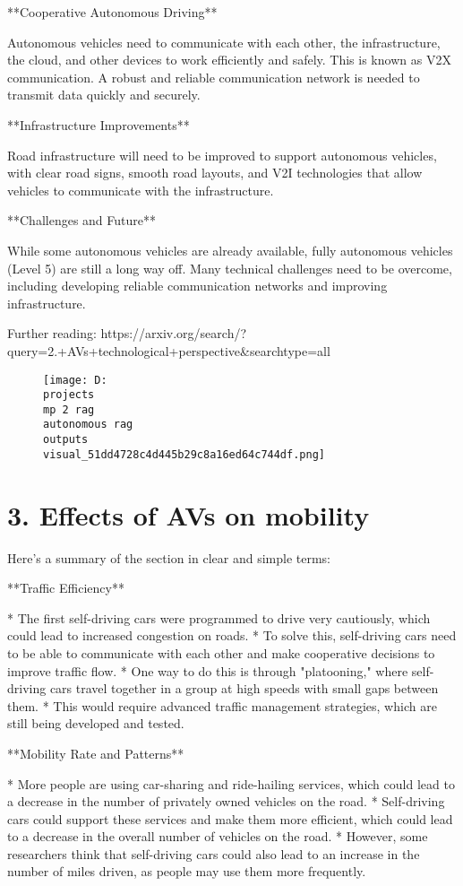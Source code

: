 \documentclass[12pt,a4paper]{article}
\begin{document}
**Cooperative Autonomous Driving**

Autonomous vehicles need to communicate with each other, the infrastructure, the cloud, and other devices to work efficiently and safely. This is known as V2X communication. A robust and reliable communication network is needed to transmit data quickly and securely.

**Infrastructure Improvements**

Road infrastructure will need to be improved to support autonomous vehicles, with clear road signs, smooth road layouts, and V2I technologies that allow vehicles to communicate with the infrastructure.

**Challenges and Future**

While some autonomous vehicles are already available, fully autonomous vehicles (Level 5) are still a long way off. Many technical challenges need to be overcome, including developing reliable communication networks and improving infrastructure.

Further reading: https://arxiv.org/search/?query=2.+AVs+technological+perspective&searchtype=all
\begin{figure}[h]
\centering
\texttt{[image: D:\\projects\\mp 2 rag\\autonomous rag\\outputs\\visual\_51dd4728c4d445b29c8a16ed64c744df.png]}
\end{figure}
\section{3. Effects of AVs on mobility}
Here's a summary of the section in clear and simple terms:

**Traffic Efficiency**

* The first self-driving cars were programmed to drive very cautiously, which could lead to increased congestion on roads.
* To solve this, self-driving cars need to be able to communicate with each other and make cooperative decisions to improve traffic flow.
* One way to do this is through "platooning," where self-driving cars travel together in a group at high speeds with small gaps between them.
* This would require advanced traffic management strategies, which are still being developed and tested.

**Mobility Rate and Patterns**

* More people are using car-sharing and ride-hailing services, which could lead to a decrease in the number of privately owned vehicles on the road.
* Self-driving cars could support these services and make them more efficient, which could lead to a decrease in the overall number of vehicles on the road.
* However, some researchers think that self-driving cars could also lead to an increase in the number of miles driven, as people may use them more frequently.
\end{document}

